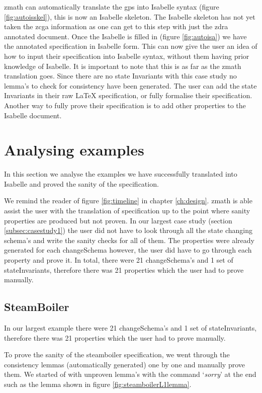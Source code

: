 \Gls{zmath} can automatically translate the \gls{gps} into Isabelle syntax
(figure \ref{fig:autoisskel}), this is now an Isabelle skeleton. The Isabelle
skeleton has not yet taken the \gls{zcga} information as one can get to this
step with just the \gls{zdra} annotated document. Once the Isabelle is filled in
(figure \ref{fig:autoisa}) we have the annotated specification in Isabelle form.
This can now give the user an idea of how to input their specification into
Isabelle syntax, without them having prior knowledge of Isabelle. It is
important to note that this is as far as the \gls{zmath} translation goes. Since
there are no state Invariants with this case study no lemma's to check for
consistency have been generated. The user can add the state Invariants in their
raw \LaTeX{} specification, or fully formalise their specification. Another way
to fully prove their specification is to add other properties to the Isabelle
document.

\section{Analysing examples}

In this section we analyse the examples we have successfully translated into
Isabelle and proved the sanity of the specification. 


We remind the reader of figure \ref{fig:timeline} in chapter \ref{ch:design}.
\Gls{zmath} is able assist the user with the translation of specification up to
the point where sanity properties are produced but not proven. In our largest
case study (section \ref{subsec:casestudy1}) the user did not have to look
through all the state changing schema's and write the sanity checks for all of
them. The properties were already generated for each changeSchema however, the
user did have to go through each property and prove it. In total, there were 21
changeSchema's and 1 set of stateInvariants, therefore there was 21 properties
which the user had to prove manually.

\subsection{SteamBoiler}

In our largest example there were 21 changeSchema's and 1 set of
stateInvariants, therefore there was 21 properties which the user had to prove
manually.

To prove the sanity of the steamboiler specification, we went through the
consistency lemmas (automatically generated) one by one and manually prove them.
We started of with unproven lemma's with the command `\emph{sorry}' at the end
such as the lemma shown in figure \ref{fig:steamboilerL1lemma}.

